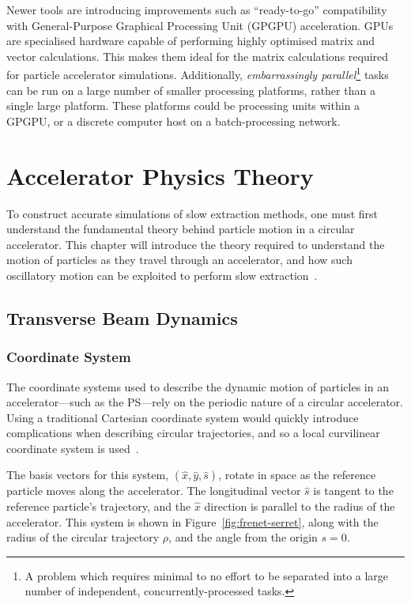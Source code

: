 \documentclass[a4paper,twoside,11pt]{report}
\begin{document}
Newer tools are introducing improvements such as ``ready-to-go'' compatibility with General-Purpose Graphical Processing Unit (GPGPU) acceleration. GPUs are specialised hardware capable of performing highly optimised matrix and vector calculations. This makes them ideal for the matrix calculations required for particle accelerator simulations. Additionally, \textit{embarrassingly parallel}\footnote{A problem which requires minimal to no effort to be separated into a large number of independent, concurrently-processed tasks.} tasks can be run on a large number of smaller processing platforms, rather than a single large platform. These platforms could be processing units within a GPGPU, or a discrete computer host on a batch-processing network.

\chapter{Accelerator Physics Theory}\label{chap:theory}

To construct accurate simulations of slow extraction methods, one must first understand the fundamental theory behind particle motion in a circular accelerator. This chapter will introduce the theory required to understand the motion of particles as they travel through an accelerator, and how such oscillatory motion can be exploited to perform slow extraction~\cite{Wiedemann}.
\section{Transverse Beam Dynamics}\label{sec:theory-transverse}

\subsection{Coordinate System}

The coordinate systems used to describe the dynamic motion of particles in an accelerator---such as the PS---rely on the periodic nature of a circular accelerator. Using a traditional Cartesian coordinate system would quickly introduce complications when describing circular trajectories, and so a local curvilinear coordinate system is used~\cite{BDSIM}.

The basis vectors for this system, $(\hat x, \hat y, \hat s)$, rotate in space as the reference particle moves along the accelerator. The longitudinal vector $\hat s$ is tangent to the reference particle's trajectory, and the $\hat x$ direction is parallel to the radius of the accelerator.  This system is shown in Figure~\ref{fig:frenet-serret}, along with the radius of the circular trajectory $\rho$, and the angle from the origin $s=0$. 
\end{document}
